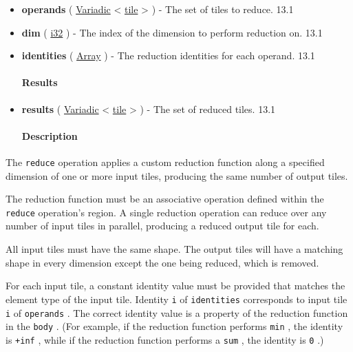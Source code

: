 \documentclass{article}
\begin{document}
\begin{itemize}
\item \textbf{operands} ( \href{https://docs.nvidia.com/cuda/tile-ir/latest/sections/operations.html#type-variadic}{Variadic} < \href{https://docs.nvidia.com/cuda/tile-ir/latest/sections/types.html#type-tile}{tile} > ) - The set of tiles to reduce. 13.1
\item \textbf{dim} ( \href{https://docs.nvidia.com/cuda/tile-ir/latest/sections/types.html#subsection-element-types}{i32} ) - The index of the dimension to perform reduction on. 13.1
\item \textbf{identities} ( \href{https://docs.nvidia.com/cuda/tile-ir/latest/sections/operations.html#type-array}{Array} ) - The reduction identities for each operand. 13.1


\paragraph{Results}

\item \textbf{results} ( \href{https://docs.nvidia.com/cuda/tile-ir/latest/sections/operations.html#type-variadic}{Variadic} < \href{https://docs.nvidia.com/cuda/tile-ir/latest/sections/types.html#type-tile}{tile} > ) - The set of reduced tiles. 13.1


\paragraph{Description}

\end{itemize}
The \texttt{reduce} operation applies a custom reduction function along a specified dimension of one or more input tiles, producing the same number of output tiles.


The reduction function must be an associative operation defined within the \texttt{reduce} operation's region. A single reduction operation can reduce over any number of input tiles in parallel, producing a reduced output tile for each.


All input tiles must have the same shape. The output tiles will have a matching shape in every dimension except the one being reduced, which is removed.


For each input tile, a constant identity value must be provided that matches the element type of the input tile. Identity \texttt{i} of \texttt{identities} corresponds to input tile \texttt{i} of \texttt{operands} . The correct identity value is a property of the reduction function in the \texttt{body} . (For example, if the reduction function performs \texttt{min} , the identity is \texttt{+inf} , while if the reduction function performs a \texttt{sum} , the identity is \texttt{0} .)
\end{document}
